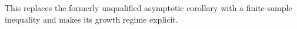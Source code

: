 This replaces the formerly unqualified asymptotic corollary with a finite-sample inequality and makes its growth regime explicit.